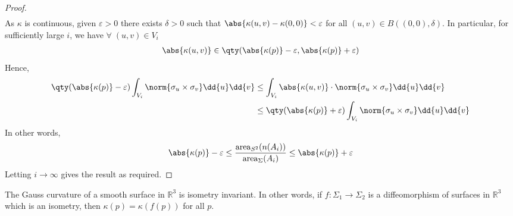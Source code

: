 \begin{proof}
\begin{align*}
	\end{align*}
	As $\kappa$ is continuous, given $\varepsilon > 0$ there exists $\delta > 0$ such that $\abs{\kappa(u,v) - \kappa(0,0)} < \varepsilon$ for all $(u,v) \in B((0,0), \delta)$.
	In particular, for sufficiently large $i$, we have $\forall \; (u, v) \in V_i$
	\begin{align*}
		\abs{\kappa(u,v)} \in \qty(\abs{\kappa(p)}-\varepsilon, \abs{\kappa(p)}+\varepsilon)
	\end{align*}
	Hence,
	\begin{align*}
		\qty(\abs{\kappa(p)}-\varepsilon) \int_{V_i} \norm{\sigma_u \times \sigma_v} \dd{u}\dd{v} &\leq \int_{V_i} \abs{\kappa(u,v)} \cdot \norm{\sigma_u \times \sigma_v} \dd{u}\dd{v} \\
		&\leq \qty(\abs{\kappa(p)}+\varepsilon) \int_{V_i} \norm{\sigma_u \times \sigma_v} \dd{u}\dd{v}
	\end{align*}
	In other words,
	\begin{align*}
		\abs{\kappa(p)}-\varepsilon \leq \frac{\mathrm{area}_{S^2} (n(A_i))}{\mathrm{area}_{\Sigma} (A_i)} \leq \abs{\kappa(p)} + \varepsilon
	\end{align*}
	Letting $i \to \infty$ gives the result as required.
\end{proof}

\begin{theorem} \label{thm:egregium}
	The Gauss curvature of a smooth surface in $\mathbb R^3$ is isometry invariant.
	In other words, if $f \colon \Sigma_1 \to \Sigma_2$ is a diffeomorphism of surfaces in $\mathbb R^3$ which is an isometry, then $\kappa(p) = \kappa(f(p))$ for all $p$.
\end{theorem}


